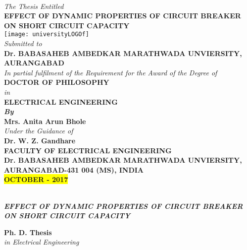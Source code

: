 \begin{center}
~\\
\textit{\small The Thesis Entitled}\\
\vspace{1cm}
\textcolor{ured}{\textbf{\large EFFECT OF DYNAMIC PROPERTIES OF CIRCUIT BREAKER ON SHORT CIRCUIT CAPACITY}}\\
\vspace{0.5cm}
\texttt{[image: universityLOGOf]}\\
\vspace{0.6cm}
\textit{\normalsize Submitted to}\\
\vspace{0.5cm}
\textcolor{ublue}{\textbf{\large Dr. BABASAHEB AMBEDKAR MARATHWADA UNVIERSITY, AURANGABAD}}\\
\vspace{1cm}
\textit{\normalsize In partial fulfilment of the Requirement for the Award of the Degree of}\\
\textbf{\large DOCTOR OF PHILOSOPHY}\\
\textit{\normalsize in}\\
\textbf{\normalsize ELECTRICAL ENGINEERING}\\
\textbf{\textit{\small By}}\\
\textcolor{ured}{\textbf{\normalsize Mrs. Anita Arun Bhole}}\\
\textit{\normalsize Under the Guidance of}\\
\textcolor{ured}{\textbf{\large Dr. W. Z. Gandhare}}\\
\vspace{1cm}
\textbf{\normalsize FACULTY OF ELECTRICAL ENGINEERING}\\
\textbf{\large Dr. BABASAHEB AMBEDKAR MARATHWADA UNVIERSITY, AURANGABAD-431 004 (MS), INDIA\\
\colorbox{Yellow}{OCTOBER - 2017}}
\end{center}
\clearpage
~\\
\textcolor{ured}{\textbf{\textit{\large EFFECT OF DYNAMIC PROPERTIES OF CIRCUIT BREAKER ON SHORT CIRCUIT CAPACITY}}}
\vspace{2cm}

\textcolor{ublue}{\textbf{\large Ph. D. Thesis}}\\
\textit{\normalsize in Electrical Engineering}\\
\vspace{2.5cm}


